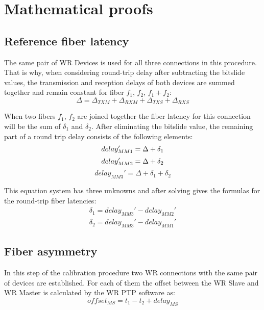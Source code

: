 \section{Mathematical proofs}

\subsection{Reference fiber latency}
\label{subsec:app_filat}
The same pair of WR Devices is used for all three connections in this procedure.
That is why, when considering round-trip delay after subtracting the bitslide
values, the transmission and reception delays of both devices are summed
together and remain constant for fiber $f_1$, $f_2$, $f_1 + f_2$:
\begin{equation}
	\Delta = \Delta_{TXM} + \Delta_{RXM} + \Delta_{TXS} + \Delta_{RXS}
\end{equation}

When two fibers $f_1$, $f_2$ are joined together the fiber latency for this
connection will be the sum of $\delta_1$ and $\delta_2$. After eliminating the 
bitslide value, the remaining part of a round trip delay consists of the 
following elements:
\begin{equation}
	delay_{MM1}' = \Delta + \delta_1\\
\end{equation}
\begin{equation}
	delay_{MM2}' = \Delta + \delta_2\\
\end{equation}
\begin{equation}
	delay_{MM3}' = \Delta + \delta_1 + \delta_2
\end{equation}

This equation system has three unknowns and after solving gives the formulas for
the round-trip fiber latencies:
\begin{align}
	\delta_1 = delay_{MM3}' - delay_{MM2}'\\
	\delta_2 = delay_{MM3}' - delay_{MM1}'
\end{align}

\subsection{Fiber asymmetry}
\label{subsec:app_fiasym}

In this step of the calibration procedure two WR connections with the same pair
of devices are established. For each of them the offset between the WR Slave and
WR Master is calculated by the WR PTP software as:
\begin{equation}
	offset_{MS} = t_1 - t_2 + delay_{MS}
\end{equation}

